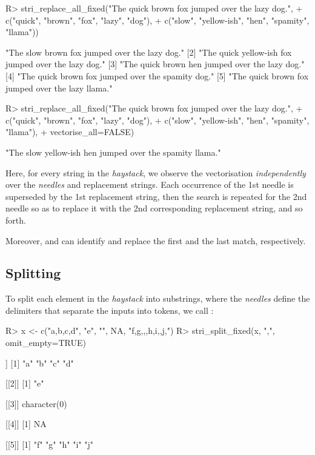 \documentclass[nojss]{jss}
\begin{document}
\begin{Schunk}
\begin{Sinput}
R> stri_replace_all_fixed("The quick brown fox jumped over the lazy dog.",
+    c("quick", "brown",      "fox", "lazy",    "dog"),
+    c("slow",  "yellow-ish", "hen", "spamity", "llama"))
\end{Sinput}
\begin{Soutput}
[1] "The slow brown fox jumped over the lazy dog."
[2] "The quick yellow-ish fox jumped over the lazy dog."
[3] "The quick brown hen jumped over the lazy dog."
[4] "The quick brown fox jumped over the spamity dog."
[5] "The quick brown fox jumped over the lazy llama."
\end{Soutput}
\begin{Sinput}
R> stri_replace_all_fixed("The quick brown fox jumped over the lazy dog.",
+    c("quick", "brown",      "fox", "lazy", "dog"),
+    c("slow",  "yellow-ish", "hen", "spamity", "llama"),
+    vectorise_all=FALSE)
\end{Sinput}
\begin{Soutput}
[1] "The slow yellow-ish hen jumped over the spamity llama."
\end{Soutput}
\end{Schunk}

\noindent
Here, for every string in the \textit{haystack}, we observe the vectorisation
\textit{independently} over the \textit{needles} and replacement strings.
Each occurrence of the 1st needle is superseded by the 1st replacement
string, then the search is repeated for the 2nd needle so as to replace
it with the 2nd corresponding replacement string, and so forth.

Moreover,  and 
can identify and replace the first and the last match, respectively.




\subsection{Splitting}

To  split each element in the \textit{haystack} into substrings,
where the \textit{needles} define the delimiters that separate
the inputs into tokens,
we call :

\begin{Schunk}
\begin{Sinput}
R> x <- c("a,b,c,d", "e", "", NA, "f,g,,,h,i,,j,")
R> stri_split_fixed(x, ",", omit_empty=TRUE)
\end{Sinput}
\begin{Soutput}
[[1]]
[1] "a" "b" "c" "d"

[[2]]
[1] "e"

[[3]]
character(0)

[[4]]
[1] NA

[[5]]
[1] "f" "g" "h" "i" "j"
\end{Soutput}
\end{Schunk}
\end{document}
